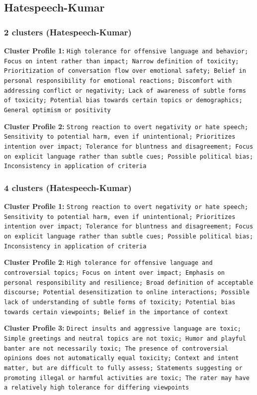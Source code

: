 \documentclass[11pt]{article}
\begin{document}
\subsection{Hatespeech-Kumar}


\subsubsection{2 clusters (Hatespeech-Kumar)}


\textbf{Cluster Profile 1:} \texttt{High tolerance for offensive language and behavior; Focus on intent rather than impact; Narrow definition of toxicity; Prioritization of conversation flow over emotional safety; Belief in personal responsibility for emotional reactions; Discomfort with addressing conflict or negativity; Lack of awareness of subtle forms of toxicity; Potential bias towards certain topics or demographics; General optimism or positivity}


\textbf{Cluster Profile 2:} \texttt{Strong reaction to overt negativity or hate speech; Sensitivity to potential harm, even if unintentional; Prioritizes intention over impact; Tolerance for bluntness and disagreement; Focus on explicit language rather than subtle cues; Possible political bias; Inconsistency in application of criteria}


\subsubsection{4 clusters (Hatespeech-Kumar)}


\textbf{Cluster Profile 1:} \texttt{Strong reaction to overt negativity or hate speech; Sensitivity to potential harm, even if unintentional; Prioritizes intention over impact; Tolerance for bluntness and disagreement; Focus on explicit language rather than subtle cues; Possible political bias; Inconsistency in application of criteria}


\textbf{Cluster Profile 2:} \texttt{High tolerance for offensive language and controversial topics; Focus on intent over impact; Emphasis on personal responsibility and resilience; Broad definition of acceptable discourse; Potential desensitization to online interactions; Possible lack of understanding of subtle forms of toxicity; Potential bias towards certain viewpoints; Belief in the importance of context}


\textbf{Cluster Profile 3:} \texttt{Direct insults and aggressive language are toxic; Simple greetings and neutral topics are not toxic; Humor and playful banter are not necessarily toxic; The presence of controversial opinions does not automatically equal toxicity; Context and intent matter, but are difficult to fully assess; Statements suggesting or promoting illegal or harmful activities are toxic; The rater may have a relatively high tolerance for differing viewpoints}
\end{document}
